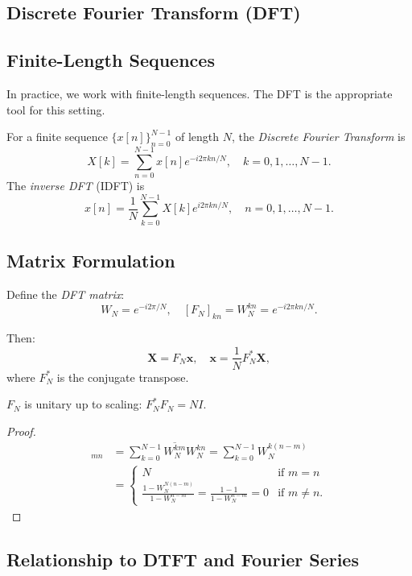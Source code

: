 \begin{notechapter}
\section{Discrete Fourier Transform (DFT)}

\subsection{Finite-Length Sequences}

In practice, we work with finite-length sequences. The DFT is the appropriate tool for this setting.

\begin{definition}[DFT]
For a finite sequence $\{x[n]\}_{n=0}^{N-1}$ of length $N$, the \emph{Discrete Fourier Transform} is
\[
X[k] = \sum_{n=0}^{N-1} x[n] e^{-i 2\pi kn/N}, \quad k = 0, 1, \ldots, N-1.
\]
The \emph{inverse DFT} (IDFT) is
\[
x[n] = \frac{1}{N} \sum_{k=0}^{N-1} X[k] e^{i 2\pi kn/N}, \quad n = 0, 1, \ldots, N-1.
\]
\end{definition}

\subsection{Matrix Formulation}

Define the \emph{DFT matrix}:
\[
W_N = e^{-i 2\pi/N}, \quad [F_N]_{kn} = W_N^{kn} = e^{-i 2\pi kn/N}.
\]

Then:
\[
\mathbf{X} = F_N \mathbf{x}, \quad \mathbf{x} = \frac{1}{N} F_N^* \mathbf{X},
\]
where $F_N^*$ is the conjugate transpose.

\begin{lemma}
$F_N$ is unitary up to scaling: $F_N^* F_N = N I$.
\end{lemma}

\begin{proof}
\begin{align*}
[F_N^* F_N]_{mn} &= \sum_{k=0}^{N-1} \overline{W_N^{km}} W_N^{kn} = \sum_{k=0}^{N-1} W_N^{k(n-m)} \\
&= \begin{cases}
N & \text{if } m = n \\
\frac{1 - W_N^{N(n-m)}}{1 - W_N^{n-m}} = \frac{1 - 1}{1 - W_N^{n-m}} = 0 & \text{if } m \neq n.
\end{cases}
\end{align*}
\end{proof}

\subsection{Relationship to DTFT and Fourier Series}


\end{notechapter}
